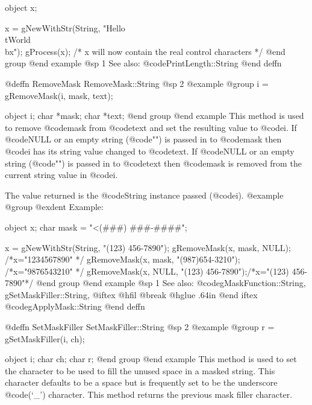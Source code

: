 object  x;

x = gNewWithStr(String, "Hello\\tWorld\\bx");
gProcess(x);
/*  x will now contain the real control characters  */
@end group
@end example
@sp 1
See also:  @code{PrintLength::String}
@end deffn













@deffn {RemoveMask} RemoveMask::String
@sp 2
@example
@group
i = gRemoveMask(i, mask, text);

object  i;
char    *mask;
char    *text;
@end group
@end example
This method is used to remove @code{mask} from @code{text} and set the
resulting value to @code{i}.  If @code{NULL} or an empty string
(@code{""}) is passed in to @code{mask} then @code{i} has its string
value changed to @code{text}.  If @code{NULL} or an empty string
(@code{""}) is passed in to @code{text} then @code{mask} is removed from
the current string value in @code{i}.

The value returned is the @code{String} instance passed (@code{i}).
@example
@group
@exdent Example:

object  x;
char    mask = "<(###) ###-####";

x = gNewWithStr(String, "(123) 456-7890");
gRemoveMask(x, mask, NULL);            /*x="1234567890"    */
gRemoveMask(x, mask, "(987)654-3210"); /*x="9876543210"    */
gRemoveMask(x, NULL, "(123) 456-7890");/*x="(123) 456-7890"*/
@end group
@end example
@sp 1
See also:  @code{gMaskFunction::String, gSetMaskFiller::String,}
@iftex
@hfil @break @hglue .64in      
@end iftex
@code{gApplyMask::String}
@end deffn













@deffn {SetMaskFiller} SetMaskFiller::String
@sp 2
@example
@group
r = gSetMaskFiller(i, ch);

object  i;
char    ch;
char    r;
@end group
@end example
This method is used to set the character to be used to fill the unused
space in a masked string.  This character defaults to be a space but is
frequently set to be the underscore @code{(`_')} character.  This method
returns the previous mask filler character.

